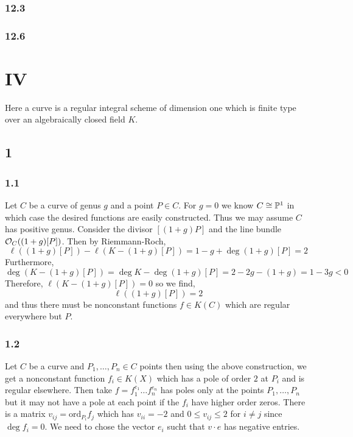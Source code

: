 \documentclass[12pt]{article}
\begin{document}
\subsubsection{12.3}

\subsubsection{12.6}

\section{IV}

\begin{definition}
Here a curve is a regular integral scheme of dimension one which is finite type over an algebraically closed field $K$.
\end{definition}

\subsection{1}

\subsubsection{1.1}

Let $C$ be a curve of genus $g$ and a point $P \in C$. For $g = 0$ we know $C \cong \P^1$ in which case the desired functions are easily constructed. Thus we may assume $C$ has positive genus. Consider the divisor $[(1 + g)P]$ and the line bundle $\struct{C}((1 + g)[P])$. Then by Riemmann-Roch,
\[ \ell((1 + g)[P]) - \ell(K - (1 + g)[P]) = 1 - g + \deg{(1 + g) [P]} = 2 \]
Furthermore,
\[ \deg{(K - (1+g)[P])} = \deg{K} - \deg{(1 + g)[P]} = 2 - 2g - (1 + g) = 1 - 3 g < 0 \]
Therefore, $\ell(K - (1 + g)[P]) = 0$ so we find,
\[ \ell((1 + g)[P]) = 2 \]
and thus there must be nonconstant functions $f \in K(C)$ which are regular everywhere but $P$. 

\subsubsection{1.2}

Let $C$ be a curve and $P_1, \dots, P_n \in C$ points then using the above construction, we get a nonconstant function $f_i \in K(X)$ which has a pole of order $2$ at $P_i$ and is regular elsewhere. Then take $f = f_1^{e_1} \dots f_n^{e_n}$ has poles only at the points $P_1, \dots, P_n$ but it may not have a pole at each point if the $f_i$ have higher order zeros. There is a matrix $v_{ij} = \mathrm{ord}_{P_i} f_j$ which has $v_{ii} = -2$ and $0 \le v_{ij} \le 2$ for $i \neq j$ since $\deg{f_i} = 0$. We need to chose the vector $e_i$ sucht that $v \cdot e$ has negative entries. 
\end{document}
